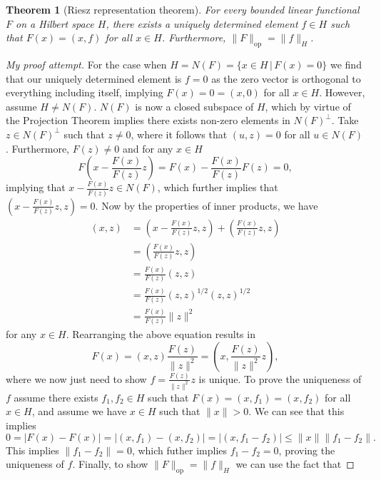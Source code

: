 \documentclass[11pt]{article}
\newtheorem{theorem}{Theorem}
\theoremstyle{definition}
\begin{document}
\begin{theorem}[Riesz representation theorem]
	For every bounded linear functional $F$ on a Hilbert space $H$, there exists a uniquely determined element $f \in H$
	such that $F(x) = (x,f)$ for all $x \in H$. Furthermore, $\|F\|_{\text{op}} = \|f\|_H$.
\end{theorem}
\begin{proof}[My proof attempt]
	For the case when $H = N(F) = \{x \in H \, | \, F(x) = 0\}$ we find that our uniquely determined element is $f=0$ as the zero vector is
	orthogonal to everything including itself, implying $F(x) = 0 = (x,0)$ for all $x \in H$. However, assume $H \not= N(F)$.
	$N(F)$ is now a closed subspace of $H$, which by virtue of the Projection Theorem implies there exists non-zero elements in $N(F)^{\bot}$.
	Take $z \in N(F)^{\bot}$ such that $z \not= 0$, where it follows that $(u,z) = 0$ for all $u \in N(F)$. Furthermore, $F(z) \not= 0$ and for any $x \in H$
	\[F\left(x - \frac{F(x)}{F(z)}z\right) = F(x) - \frac{F(x)}{F(z)}F(z) = 0,\]
	implying that $x - \frac{F(x)}{F(z)}z \in N(F)$, which further implies that $\left(x - \frac{F(x)}{F(z)}z, z\right) = 0$.
	Now by the properties of inner products, we have
	\begin{equation*}
		\begin{aligned}
			(x,z) &= \left(x - \frac{F(x)}{F(z)}z,z\right) + \left(\frac{F(x)}{F(z)}z,z\right) \\
			      &= \left(\frac{F(x)}{F(z)}z,z\right) \\
			      &= \frac{F(x)}{F(z)}(z,z) \\
			      &= \frac{F(x)}{F(z)}(z,z)^{1/2}(z,z)^{1/2} \\
			      &= \frac{F(x)}{F(z)}\|z\|^2
		\end{aligned}
	\end{equation*}
	for any $x \in H$. Rearranging the above equation results in 
	\[F(x) = (x,z)\frac{F(z)}{\|z\|^2} = \left(x,\frac{F(z)}{\|z\|^2}z\right),\]
	where we now just need to show $f = \frac{F(z)}{\|z\|^2}z$ is unique.
	To prove the uniqueness of $f$ assume there exists $f_1,f_2 \in H$ such that $F(x) = (x,f_1) = (x,f_2)$ for all $x \in H$,
	and assume we have $x \in H$ such that $\|x\| > 0$. We can see that this implies
	\begin{equation*}
		0 = |F(x) - F(x)| = |(x,f_1) - (x,f_2)| = |(x,f_1-f_2)| \leq \|x\|\|f_1 - f_2\|.
	\end{equation*}
	This implies $\|f_1-f_2\| = 0$, which futher implies $f_1-f_2= 0$, proving the uniqueness of $f$.
	Finally, to show $\|F\|_{\text{op}} = \|f\|_H$ we can use the fact that

\end{proof}
\end{document}
